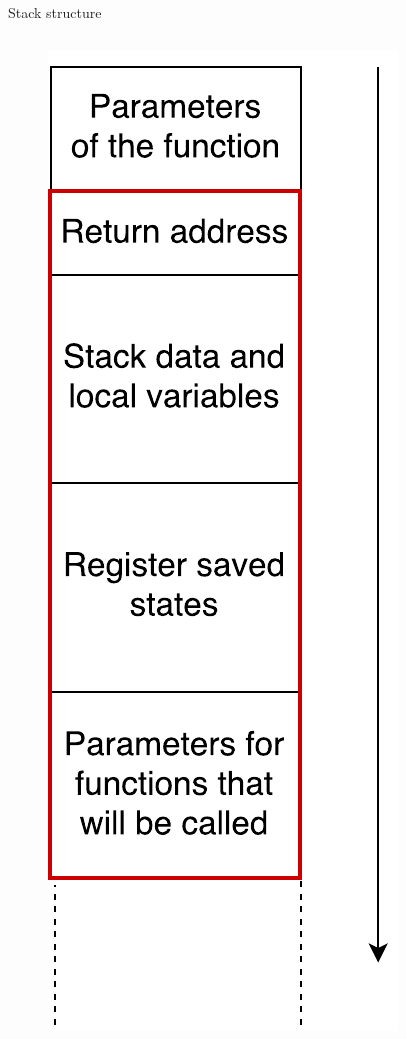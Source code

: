 \documentclass{beamer}
\begin{document}
\begin{frame}[c]{Stack structure}
\begin{columns}
\begin{column}{0.45\textwidth}
\begin{figure}
			\includegraphics[height=0.75\textheight]{images/stack_layout.pdf}
			\end{figure}
		\end{column}
	\end{columns}
\end{frame}
\end{document}
